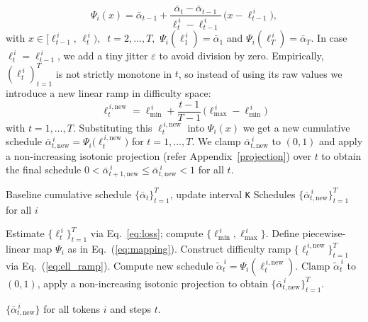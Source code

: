 \begin{equation}
\label{eq:mapping}
\Psi_i(x)
=
\bar{\alpha}_{t-1}
+
\frac{\bar{\alpha}_t - \bar{\alpha}_{t-1}}{\ell_t^{\,i} - \ell_{t-1}^{\,i}}\,
\big(x - \ell_{t-1}^{\,i}\big),
\end{equation}
with $x \in [\ell_{t-1}^{\,i},\, \ell_t^{\,i}),\;\; t=2,\dots,T,$    $\Psi_i(\ell_1^{\,i})=\bar{\alpha}_1$ and $\Psi_i(\ell_T^{\,i})=\bar{\alpha}_T$. In case $\ell_t^{\,i}=\ell_{t-1}^{\,i}$, we add a tiny jitter $\varepsilon$ to avoid division by zero. 
Empirically, $(\ell_t^{\,i})_{t=1}^T$ is not
strictly monotone in $t$, so instead of using its raw values we introduce a new linear ramp in difficulty space:
\begin{equation}
\label{eq:ell_ramp}
\ell_{t}^{\,i,\mathrm{new}}
=
\ell_{\min}^{\,i}
+
\frac{t-1}{T-1}\,\big(\ell_{\max}^{\,i} - \ell_{\min}^{\,i}\big)
\end{equation}
with $t=1,\dots,T$. Substituting this $\ell_{t}^{\,i,\mathrm{new}}$ into $\Psi_i(x)$ we get a new cumulative schedule 
$\bar{\alpha}_{t, \text{new}}^{\,i} = \Psi_i\!\big(\ell_{t}^{\,i,\mathrm{new}}\big)$ for $t=1,\dots,T$. 
We clamp $\bar{\alpha}_{t, \text{new}}^{\,i}$ to $(0,1)$ and apply a non-increasing isotonic projection (refer Appendix~\ref{projection}) over $t$ to obtain the final schedule 
$0 < \bar{\alpha}_{t+1,\mathrm{new}}^{\,i} \le \bar{\alpha}_{t,\mathrm{new}}^{\,i} < 1$ for all $t$. 





\begin{algorithm}[t!]
\caption{Token Aware Noise Schedule}
\label{alg:graph_aware_training}
\begin{algorithmic}[1]
\REQUIRE Baseline cumulative schedule $\{\bar{\alpha}_t\}_{t=1}^T$, update interval \texttt{K}
\ENSURE Schedules $\{\bar{\alpha}^{\,i}_{t,\mathrm{new}}\}_{t=1}^T$ for all $i$

    \STATE Estimate $\{\ell_t^{\,i}\}_{t=1}^T$ via Eq.~\ref{eq:loss}; 
           compute $\{\ell_{\min}^{\,i}, \ell_{\max}^{\,i}\}$.
    \STATE Define piecewise-linear map $\Psi_i$ as in Eq.~(\ref{eq:mapping}).
    \STATE Construct difficulty ramp $\{\ell_{t}^{\,i,\mathrm{new}}\}_{t=1}^T$ via Eq.~(\ref{eq:ell_ramp}).
    \STATE Compute new schedule $\tilde{\alpha}_t^{\,i} = \Psi_i(\ell_{t}^{\,i,\mathrm{new}})$.
    \STATE Clamp $\tilde{\alpha}_t^{\,i}$ to $(0,1)$, apply a non-increasing
           isotonic projection to obtain 
           $\{\bar{\alpha}^{\,i}_{t,\mathrm{new}}\}_{t=1}^T$.
  \ENDFOR
\ENDIF

\RETURN $\{\bar{\alpha}^{\,i}_{t,\mathrm{new}}\}$ for all tokens $i$ and steps $t$.
\end{algorithmic}
\end{algorithm}
\vspace{-4mm}

